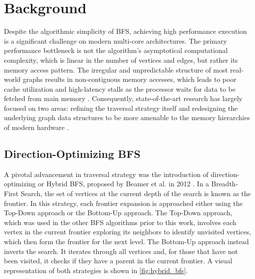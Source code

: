 \chapter{Background}
Despite the algorithmic simplicity of BFS, achieving high performance execution is a significant challenge on modern multi-core architectures. The primary performance bottleneck is not the algorithm's asymptotical computational complexity, which is linear in the number of vertices and edges, but rather its memory access pattern. The irregular and unpredictable structure of most real-world graphs results in non-contiguous memory accesses, which leads to poor cache utilization and high-latency stalls as the processor waits for data to be fetched from main memory \cite{lenharth2016parallel, lumsdaine2007challenges}. Consequently, state-of-the-art research has largely focused on two areas: refining the traversal strategy itself \cite{arai2024doubling, beamer2013direction, jia2012edge} and redesigning the underlying graph data structures to be more amenable to the memory hierarchies of modern hardware \cite{torok2020improving, iwabuchi2014nvm}.

\section{Direction-Optimizing BFS}
A pivotal advancement in traversal strategy was the introduction of direction-optimizing or Hybrid BFS, proposed by Beamer et al. in 2012 \cite{beamer2013direction}. In a Breadth-First Search, the set of vertices at the current depth of the search is known as the frontier. In this strategy, each frontier expansion is approached either using the Top-Down approach or the Bottom-Up approach. The Top-Down approach, which was used in the other BFS algorithms prior to this work, involves each vertex in the current frontier exploring its neighbors to identify unvisited vertices, which then form the frontier for the next level. The Bottom-Up approach instead inverts the search. It iterates through all vertices and, for those that have not been visited, it checks if they have a parent in the current frontier. A visual representation of both strategies is shown in \cref{fig:hybrid_bfs}. 

